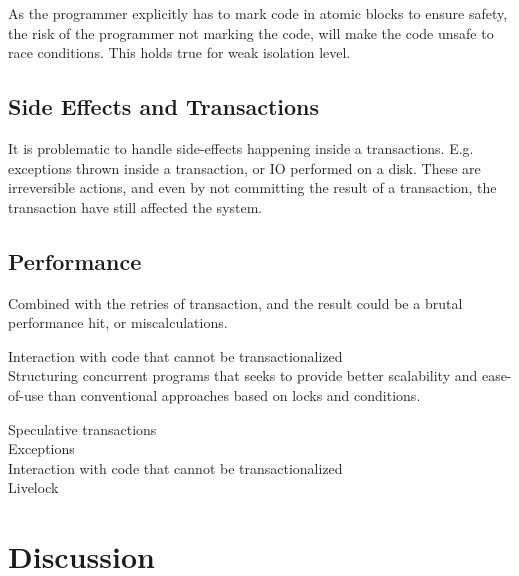 As the programmer explicitly has to mark code in atomic blocks to ensure safety, the risk of the programmer not marking the code, will make the code unsafe to race conditions. This holds true for weak isolation level.




\subsection{Side Effects and Transactions}
It is problematic to handle side-effects happening inside a transactions. E.g. exceptions thrown inside a transaction, or \ac{IO} performed on a disk. These are irreversible actions, and even by not committing the result of a transaction, the transaction have still affected the system. 

\subsection{Performance}
Combined with the retries of transaction, and the result could be a brutal performance hit, or miscalculations.

Interaction with code that cannot be transactionalized\\

Structuring concurrent programs that seeks to provide better scalability and ease-of-use than conventional approaches based on locks and conditions.


Speculative transactions\\
Exceptions\\
Interaction with code that cannot be transactionalized\\
Livelock\\





\section{Discussion}
\label{sec:stm_discussion}

